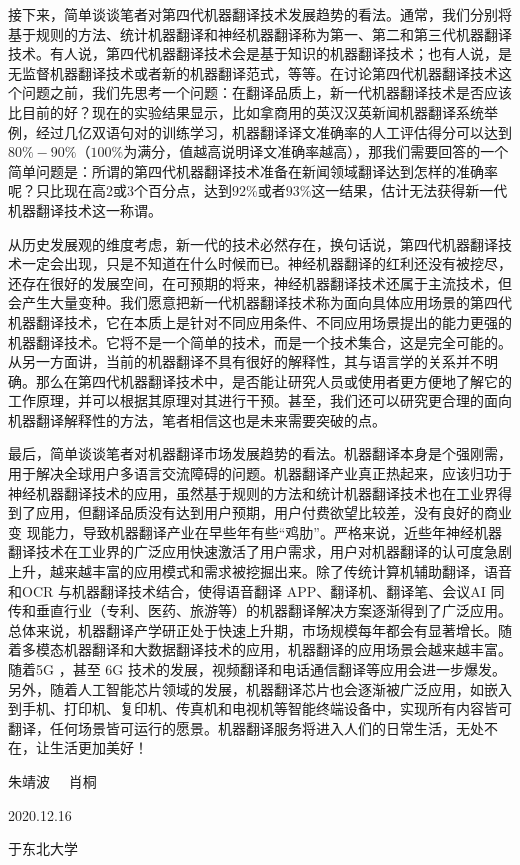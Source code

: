 \begin{spacing}{1.18}
\parinterval 接下来，简单谈谈笔者对第四代机器翻译技术发展趋势的看法。通常，我们分别将基于规则的方法、统计机器翻译和神经机器翻译称为第一、第二和第三代机器翻译技术。有人说，第四代机器翻译技术会是基于知识的机器翻译技术；也有人说，是无监督机器翻译技术或者新的机器翻译范式，等等。在讨论第四代机器翻译技术这个问题之前，我们先思考一个问题：在翻译品质上，新一代机器翻译技术是否应该比目前的好？现在的实验结果显示，比如拿商用的英汉汉英新闻机器翻译系统举例，经过几亿双语句对的训练学习，机器翻译译文准确率的人工评估得分可以达到$80\%-90\%$（$100\%$为满分，值越高说明译文准确率越高），那我们需要回答的一个简单问题是：所谓的第四代机器翻译技术准备在新闻领域翻译达到怎样的准确率呢？只比现在高$2$或$3$个百分点，达到$92\%$或者$93\%$这一结果，估计无法获得新一代机器翻译技术这一称谓。

\parinterval 从历史发展观的维度考虑，新一代的技术必然存在，换句话说，第四代机器翻译技术一定会出现，只是不知道在什么时候而已。神经机器翻译的红利还没有被挖尽，还存在很好的发展空间，在可预期的将来，神经机器翻译技术还属于主流技术，但会产生大量变种。我们愿意把新一代机器翻译技术称为面向具体应用场景的第四代机器翻译技术，它在本质上是针对不同应用条件、不同应用场景提出的能力更强的机器翻译技术。它将不是一个简单的技术，而是一个技术集合，这是完全可能的。从另一方面讲，当前的机器翻译不具有很好的解释性，其与语言学的关系并不明确。那么在第四代机器翻译技术中，是否能让研究人员或使用者更方便地了解它的工作原理，并可以根据其原理对其进行干预。甚至，我们还可以研究更合理的面向机器翻译解释性的方法，笔者相信这也是未来需要突破的点。

\parinterval 最后，简单谈谈笔者对机器翻译市场发展趋势的看法。机器翻译本身是个强刚需，用于解决全球用户多语言交流障碍的问题。机器翻译产业真正热起来，应该归功于神经机器翻译技术的应用，虽然基于规则的方法和统计机器翻译技术也在工业界得到了应用，但翻译品质没有达到用户预期，用户付费欲望比较差，没有良好的商业变  现能力，导致机器翻译产业在早些年有些“鸡肋”。严格来说，近些年神经机器翻译技术在工业界的广泛应用快速激活了用户需求，用户对机器翻译的认可度急剧上升，越来越丰富的应用模式和需求被挖掘出来。除了传统计算机辅助翻译，语音和OCR 与机器翻译技术结合，使得语音翻译 APP、翻译机、翻译笔、会议AI 同传和垂直行业（专利、医药、旅游等）的机器翻译解决方案逐渐得到了广泛应用。总体来说，机器翻译产学研正处于快速上升期，市场规模每年都会有显著增长。随着多模态机器翻译和大数据翻译技术的应用，机器翻译的应用场景会越来越丰富。随着5G ，甚至 6G 技术的发展，视频翻译和电话通信翻译等应用会进一步爆发。另外，随着人工智能芯片领域的发展，机器翻译芯片也会逐渐被广泛应用，如嵌入到手机、打印机、复印机、传真机和电视机等智能终端设备中，实现所有内容皆可翻译，任何场景皆可运行的愿景。机器翻译服务将进入人们的日常生活，无处不在，让生活更加美好！\\

\vspace{8em}

\hfill 朱靖波 \ \ 肖桐

\hfill 2020.12.16

\hfill 于东北大学


\end{spacing}
